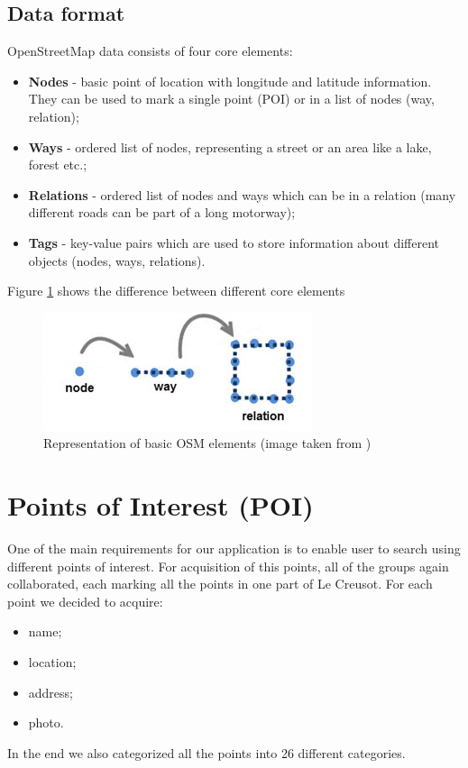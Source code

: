\subsection{Data format}
OpenStreetMap data consists of four core elements:
\begin{itemize}
\item \textbf{Nodes} - basic point of location with longitude and latitude information. They can be used to mark a single point (POI) or in a list of nodes (way, relation);
\item \textbf{Ways} - ordered list of nodes, representing a street or an area like a lake, forest etc.;
\item \textbf{Relations} - ordered list of nodes and ways which can be in a relation (many different roads can be part of a long motorway);
\item \textbf{Tags} - key-value pairs which are used to store information about different objects (nodes, ways, relations).
\end{itemize}
Figure \ref{fig:Osm_flow} shows the difference between different core elements
\begin{figure}[h]
\centering
\includegraphics[width=0.5\linewidth]{../pictures/osm_flow.png}
\caption{Representation of basic OSM elements (image taken from \cite{osm_2})}
\label{fig:Osm_flow}
\end{figure}

\section{Points of Interest (POI)}
One of the main requirements for our application is to enable user to search using different points of interest. For acquisition of this points, all of the groups again collaborated, each marking all the points in one part of Le Creusot. For each point we decided to acquire:
\begin{itemize}
\item name;
\item location;
\item address;
\item photo.
\end{itemize}
In the end we also categorized all the points into 26 different categories. 
